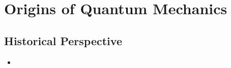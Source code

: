 \documentclass[../notes.tex]{subfiles}
\begin{document}
\chapter{Origins of Quantum Mechanics}
\section{Historical Perspective}
\begin{itemize}
    \item {}
\end{itemize}
\end{document}
